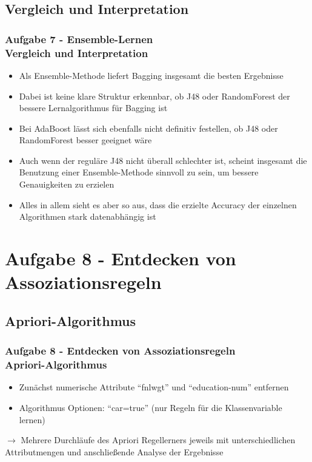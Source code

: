 \documentclass[accentcolor=tud10b,colorbacktitle,inverttitle,landscape,german,presentation,t]{tudbeamer}
\begin{document}
    \subsection{Vergleich und Interpretation}
    
    \begin{frame}[t]
    \frametitle{Aufgabe 7 - Ensemble-Lernen\\ Vergleich und Interpretation}
        \begin{itemize}
            \item Als Ensemble-Methode liefert Bagging insgesamt die besten Ergebnisse
            \item Dabei ist keine klare Struktur erkennbar, ob J48 oder RandomForest der bessere Lernalgorithmus für Bagging ist
            \item Bei AdaBoost lässt sich ebenfalls nicht definitiv festellen, ob J48 oder RandomForest besser geeignet wäre
            \item Auch wenn der reguläre J48 nicht überall schlechter ist, scheint insgesamt die Benutzung einer Ensemble-Methode sinnvoll zu sein, um bessere Genauigkeiten zu erzielen
            \item Alles in allem sieht es aber so aus, dass die erzielte Accuracy der einzelnen Algorithmen stark datenabhängig ist
        \end{itemize}
    \end{frame}
    
    \section{Aufgabe 8 - Entdecken von Assoziationsregeln}
    
    \subsection{Apriori-Algorithmus}
    
    \begin{frame}[t]
    \frametitle{Aufgabe 8 - Entdecken von Assoziationsregeln\\ Apriori-Algorithmus}
        \begin{itemize}
            \item Zunächst numerische Attribute ``fnlwgt'' und ``education-num'' entfernen
            \item Algorithmus Optionen: ``car=true'' (nur Regeln für die Klassenvariable lernen)
        \end{itemize}
        \vfill
        $\rightarrow$ Mehrere Durchläufe des Apriori Regellerners jeweils mit unterschiedlichen Attributmengen und anschließende Analyse der Ergebnisse
    \end{frame}
    
\end{document}

